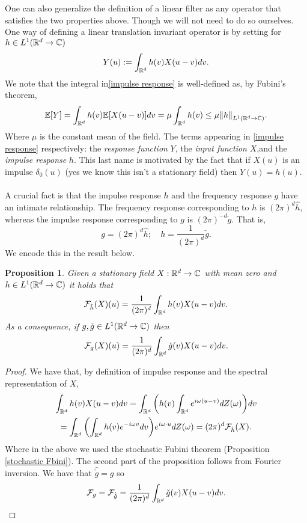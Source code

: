 \documentclass[12pt]{article}
\newtheorem{proposition}{Proposition}
\begin{document}
One can also generalize the definition of a linear filter as any operator that satisfies the two properties above. Though we will not need to do so ourselves. One way of defining a linear translation invariant operator is by setting for $h\in L^1({\mathbb R}^d\to\mathbb{C})$
\begin{equation}\label{impulse response}
	Y(u):=\int_{{\mathbb R}^d} h(v)X(u-v) dv.
\end{equation}
We note that the integral in\eqref{impulse response} is well-defined as, by Fubini's theorem,
\begin{equation*}
	\mathbb{E}[Y]=\int_{{\mathbb R}^d} h(v)\mathbb{E}[X(u-v)] dv=\mu\int_{{\mathbb R}^d} h(v)\leq \mu\norm{h}_{L^1({\mathbb R}^d\to\mathbb{C})}.
\end{equation*}
Where $\mu$ is the constant mean of the field.
The terms appearing in \eqref{impulse response} respectively: the \emph{response function} $Y$,  the \emph{input function} $X$,and  the \emph{impulse response} $h$. This last name is motivated by the fact that if $X(u)$ is an impulse $\delta _0(u)$ (yes we know this isn't a stationary field) then $Y(u)=h(u)$.\\
\\
A crucial fact is that the impulse response $h$ and the frequency response $g$ have an intimate relationship. The frequency response corresponding to  $h$ is $(2\pi)^d\hat{h}$, whereas the impulse response corresponding to $g$ is $(2\pi)^{-d}\check{g}$. That is,
\begin{equation*}
	g=(2\pi)^d\hat{h};\quad h=\frac{1}{(2\pi)^d}\check{g}.
\end{equation*}
We encode this in the result below.
\begin{proposition}
	Given a  stationary field $X:{\mathbb R}^d\to\mathbb{C}$ with mean zero and\\ $h\in L^1({\mathbb R}^d\to\mathbb{C})$  it holds that
	\begin{equation*}
		\mathcal{F}_{\hat{h}}(X)(u)=\frac{1}{(2\pi)^d}\int_{{\mathbb R}^d} h(v)X(u-v) dv.
	\end{equation*}
	As a consequence, if  $g,\check{g}\in L^1({\mathbb R}^d\to\mathbb{C})$ then
	\begin{equation*}
		\mathcal{F}_g(X)(u)=\frac{1}{(2\pi)^d}\int_{{\mathbb R}^d} \check{g}(v)X(u-v) dv.
	\end{equation*}
\end{proposition}
\begin{proof}
	We have that, by definition of impulse response and the spectral representation of $X$,
	\begin{multline*}
		\int_{{\mathbb R}^d} h(v)X(u-v) dv= \int_{{\mathbb R}^d} \qty(h(v)\int_{{\mathbb R}^d} e^{i\omega (u-v)}dZ(\omega)) dv\\=\int_{{\mathbb R}^d}\qty(\int_{{\mathbb R}^d} h(v)e^{-i\omega v}dv) e^{i\omega\cdot u}dZ(\omega)=(2\pi)^d\mathcal{F}_{\hat{h}}(X).
	\end{multline*}
	Where in the above we used the stochastic Fubini theorem (Proposition \ref{stochastic Fbini}). The second part of the proposition follows from Fourier inversion. We have that $\hat{\check{g}}=g$ so
	\begin{equation*}
		\mathcal{F}_g=\mathcal{F}_{\hat{\check{g}}}=\frac{1}{(2\pi)^d}\int_{{\mathbb R}^d} \check{g}(v)X(u-v) dv.
	\end{equation*}
\end{proof}
\end{document}
